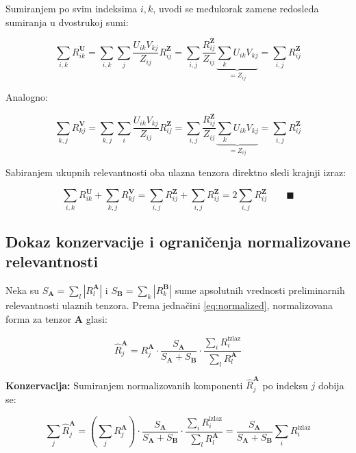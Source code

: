 Sumiranjem po svim indeksima $i, k$, uvodi se međukorak zamene redosleda sumiranja u dvostrukoj sumi:

\begin{equation*}
    \sum_{i,k} R_{ik}^{\mathbf{U}} = \sum_{i,k} \sum_j \frac{U_{ik} V_{kj}}{Z_{ij}} R_{ij}^{\mathbf{Z}} = \sum_{i,j} \frac{R_{ij}^{\mathbf{Z}}}{Z_{ij}} \underbrace{\sum_k U_{ik} V_{kj}}_{= Z_{ij}} = \sum_{i,j} R_{ij}^{\mathbf{Z}}
\end{equation*}

Analogno:

\begin{equation*}
    \sum_{k,j} R_{kj}^{\mathbf{V}} = \sum_{k,j} \sum_i \frac{U_{ik} V_{kj}}{Z_{ij}} R_{ij}^{\mathbf{Z}} = \sum_{i,j} \frac{R_{ij}^{\mathbf{Z}}}{Z_{ij}} \underbrace{\sum_k U_{ik} V_{kj}}_{= Z_{ij}} = \sum_{i,j} R_{ij}^{\mathbf{Z}}
\end{equation*}

Sabiranjem ukupnih relevantnosti oba ulazna tenzora direktno sledi krajnji izraz:

\begin{equation*}
    \sum_{i,k} R_{ik}^{\mathbf{U}} + \sum_{k,j} R_{kj}^{\mathbf{V}} = \sum_{i,j} R_{ij}^{\mathbf{Z}} + \sum_{i,j} R_{ij}^{\mathbf{Z}} = 2\sum_{i,j} R_{ij}^{\mathbf{Z}} \qquad \blacksquare
\end{equation*}

\subsection{Dokaz konzervacije i ograničenja normalizovane relevantnosti}
\label{appendix:normalization}

Neka su $S_{\mathbf{A}} = \sum_l |R_l^{\mathbf{A}}|$ i $S_{\mathbf{B}} = \sum_k |R_k^{\mathbf{B}}|$ sume apsolutnih vrednosti preliminarnih relevantnosti ulaznih tenzora. Prema jednačini \eqref{eq:normalized}, normalizovana forma za tenzor $\mathbf{A}$ glasi:

\begin{equation*}
    \hat{R}_j^{\mathbf{A}} = R_j^{\mathbf{A}} \cdot \frac{S_{\mathbf{A}}}{S_{\mathbf{A}} + S_{\mathbf{B}}} \cdot \frac{\sum_i R_i^{\text{izlaz}}}{\sum_l R_l^{\mathbf{A}}}
\end{equation*}

\textbf{Konzervacija:} Sumiranjem normalizovanih komponenti $\hat{R}_j^{\mathbf{A}}$ po indeksu $j$ dobija se:

\begin{equation*}
    \sum_j \hat{R}_j^{\mathbf{A}} = \left( \sum_j R_j^{\mathbf{A}} \right) \cdot \frac{S_{\mathbf{A}}}{S_{\mathbf{A}} + S_{\mathbf{B}}} \cdot \frac{\sum_i R_i^{\text{izlaz}}}{\sum_l R_l^{\mathbf{A}}} = \frac{S_{\mathbf{A}}}{S_{\mathbf{A}} + S_{\mathbf{B}}} \sum_i R_i^{\text{izlaz}}
\end{equation*}

